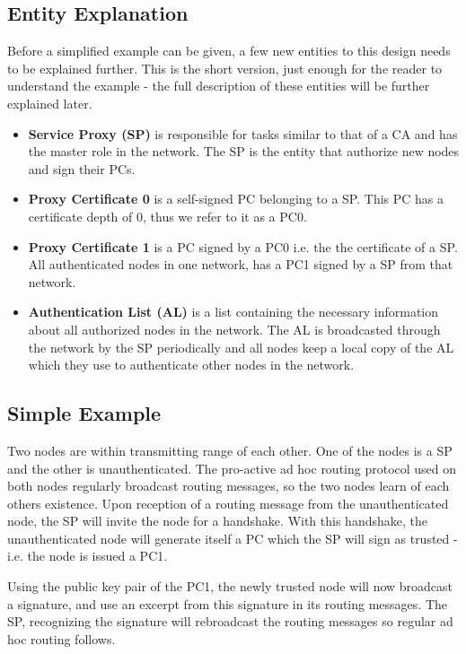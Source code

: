 \subsection{Entity Explanation}
Before a simplified example can be given, a few new entities to this design
needs to be explained further. This is the short version, just enough for the
reader to understand the example - the full description of these entities will
be further explained later.

\begin{itemize}
  \item \textbf{Service Proxy (SP)} is responsible for tasks similar to that of
  	a \ac{CA} and has the master role in the network. The \ac{SP} is the entity
  	that authorize new nodes and sign their \ac{PC}s.
  \item \textbf{Proxy Certificate 0} is a self-signed \ac{PC} belonging to a
  	\ac{SP}. This \ac{PC} has a certificate depth of 0, thus we refer to it as a
  	\ac{PC0}.
  \item \textbf{Proxy Certificate 1} is a \ac{PC} signed by a \ac{PC0} i.e. the
  	the certificate of a \ac{SP}. All authenticated nodes in one network, has a
  	\ac{PC1} signed by a \ac{SP} from that network.
  \item \textbf{Authentication List (AL)} is a list containing the necessary
  	information about all authorized nodes in the network. The \ac{AL} is
  	broadcasted through the network by the \ac{SP} periodically and all nodes
  	keep a local copy of the \ac{AL} which they use to authenticate other nodes
  	in the network.
\end{itemize}

\subsection{Simple Example}
Two nodes are within transmitting range of each other. One of the nodes is a
\ac{SP} and the other is unauthenticated. The pro-active ad hoc routing protocol
used on both nodes regularly broadcast routing messages, so the two nodes learn
of each others existence. Upon reception of a routing message from the
unauthenticated node, the \ac{SP} will invite the node for a handshake. With
this handshake, the unauthenticated node will generate itself a \ac{PC} which
the \ac{SP} will sign as trusted - i.e. the node is issued a \ac{PC1}.

Using the public key pair of the \ac{PC1}, the newly trusted node will now
broadcast a signature, and use an excerpt from this signature in its routing
messages. The \ac{SP}, recognizing the signature will rebroadcast the routing
messages so regular ad hoc routing follows.

